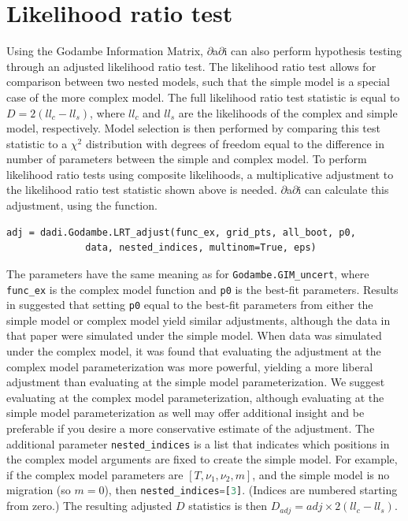 \documentclass[12pt]{article}
\makeatletter
\newcommand{\dadi}{$\partial$a$\partial$i\xspace}
\newcommand{\py}[1]{\lstinline[language=Python, showstringspaces=False]@#1@}
\makeatother
\begin{document}
\section{Likelihood ratio test}
Using the Godambe Information Matrix, \dadi can also perform hypothesis testing through an adjusted likelihood ratio test.
The likelihood ratio test allows for comparison between two nested models, such that the simple model is a special case of the more complex model.
The full likelihood ratio test statistic is equal to $D = 2(ll_{c}-ll_{s})$, where $ll_{c}$ and $ll_{s}$ are the likelihoods of the complex and simple model, respectively.
Model selection is then performed by comparing this test statistic to a $\chi^2$ distribution with degrees of freedom equal to the difference in number of parameters between the simple and complex model.
To perform likelihood ratio tests using composite likelihoods, a multiplicative adjustment to the likelihood ratio test statistic shown above is needed.
\dadi can calculate this adjustment, using the function.
\begin{lstlisting}
adj = dadi.Godambe.LRT_adjust(func_ex, grid_pts, all_boot, p0, 
			  data, nested_indices, multinom=True, eps)
\end{lstlisting}
The parameters have the same meaning as for \py{Godambe.GIM_uncert}, where \py{func_ex} is the complex model function and \py{p0} is the best-fit parameters.
Results in \cite{Coffman2016} suggested that setting \py{p0} equal to the best-fit parameters from either the simple model or complex model yield similar adjustments, although the data in that paper were simulated under the simple model.
When data was simulated under the complex model, it was found that evaluating the adjustment at the complex model parameterization was more powerful, yielding a more liberal adjustment than evaluating at the simple model parameterization.
We suggest evaluating at the complex model parameterization, although evaluating at the simple model parameterization as well may offer additional insight and be preferable if you desire a more conservative estimate of the adjustment.
The additional parameter \py{nested_indices} is a list that indicates which positions in the complex model arguments are fixed to create the simple model.
For example, if the complex model parameters are $[T, \nu_1, \nu_2, m]$, and the simple model is no migration (so $m = 0$), then \py{nested_indices=[3]}.
(Indices are numbered starting from zero.)
The resulting adjusted $D$ statistics is then $D_{adj} = adj \times 2(ll_{c}-ll_{s})$.
\end{document}
